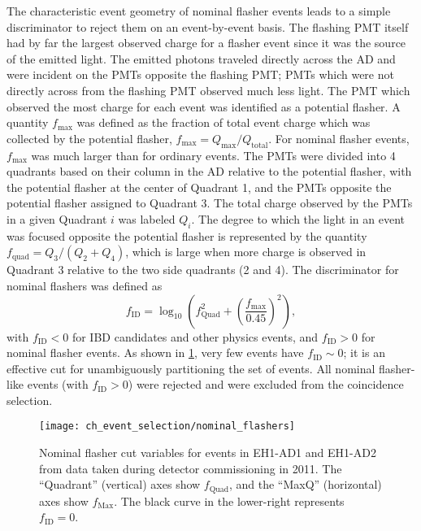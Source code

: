 The characteristic event geometry of nominal flasher events
leads to a simple discriminator to reject them on an event-by-event basis.
The flashing PMT itself had by far the largest observed charge
for a flasher event since it was the source of the emitted light.
The emitted photons traveled directly across the AD
and were incident on the PMTs opposite the flashing PMT;
PMTs which were not directly across from the flashing PMT
observed much less light.
The PMT which observed the most charge for each event
was identified as a potential flasher.
A quantity $f_{\text{max}}$ was defined as the fraction of total event charge
which was collected by the potential flasher,
$f_{\text{max}} = Q_{\text{max}}/Q_{\text{total}}$.
For nominal flasher events, $f_{\text{max}}$ was much larger than for ordinary events.
The PMTs were divided into 4 quadrants based on their column in the AD
relative to the potential flasher,
with the potential flasher at the center of Quadrant 1,
and the PMTs opposite the potential flasher assigned to Quadrant 3.
The total charge observed by the PMTs in a given Quadrant $i$
was labeled $Q_i$.
The degree to which the light in an event was focused
opposite the potential flasher
is represented by the quantity $f_{\text{quad}} = Q_3/(Q_2 + Q_4)$,
which is large when more charge is observed in Quadrant 3
relative to the two side quadrants (2 and 4).
The discriminator for nominal flashers was defined as
\begin{equation}
    f_{\text{ID}} = \log_{10}\left(
        f_{\text{Quad}}^2 + \left(
            \frac{f_{\text{max}}}{0.45}
        \right)^2
    \right),
\end{equation}
with $f_{\text{ID}} < 0$ for IBD candidates and other physics events,
and $f_{\text{ID}} > 0$ for nominal flasher events.
As shown in \cref{fig:flasher_nominal_cut},
very few events have $f_{\text{ID}}\sim0$;
it is an effective cut for unambiguously partitioning the set of events.
All nominal flasher-like events (with $f_{\text{ID}} > 0$) were rejected
and were excluded from the coincidence selection.

\begin{figure}
    \centering
    \texttt{[image: ch\_event\_selection/nominal\_flashers]}
    \caption{
        Nominal flasher cut variables for events in EH1-AD1 and EH1-AD2
        from data taken during detector commissioning in 2011.
        The ``Quadrant'' (vertical) axes show $f_\text{Quad}$,
        and the ``MaxQ'' (horizontal) axes show $f_\text{Max}$.
        The black curve in the lower-right represents $f_\text{ID} = 0$.
    }
    \label{fig:flasher_nominal_cut}
\end{figure}

